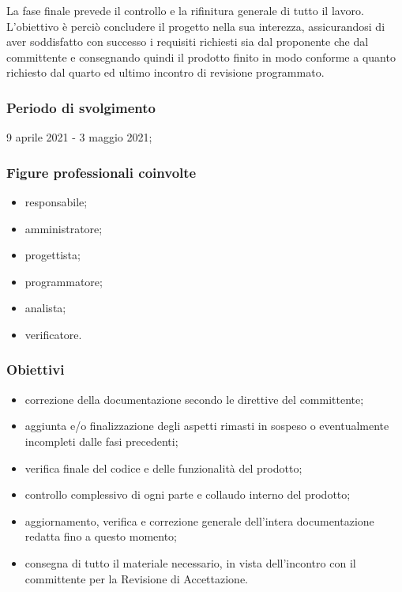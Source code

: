 La fase finale prevede il controllo e la rifinitura generale di tutto il lavoro. L'obiettivo è perciò concludere il progetto nella sua interezza, assicurandosi di aver soddisfatto con successo i requisiti richiesti sia dal proponente che dal committente e consegnando quindi il prodotto finito in modo conforme a quanto richiesto dal quarto ed ultimo incontro di revisione programmato.
        
        \subsubsection{Periodo di svolgimento}
        9 aprile 2021 - 3 maggio 2021;
        
        \subsubsection{Figure professionali coinvolte}
            \begin{itemize}
                \item responsabile;
                \item amministratore;
                \item progettista;
                \item programmatore;
                \item analista;
                \item verificatore.
            \end{itemize}

        \subsubsection{Obiettivi}
        \begin{itemize}
            \item correzione della documentazione secondo le direttive del committente;
            \item aggiunta e/o finalizzazione degli aspetti rimasti in sospeso o eventualmente incompleti dalle fasi precedenti;
            \item verifica finale del codice e delle funzionalità del prodotto;
            \item controllo complessivo di ogni parte e collaudo interno del prodotto;
            \item aggiornamento, verifica e correzione generale dell'intera documentazione redatta fino a questo momento;
            \item consegna di tutto il materiale necessario, in vista dell'incontro con il committente per la Revisione di Accettazione.
        \end{itemize}